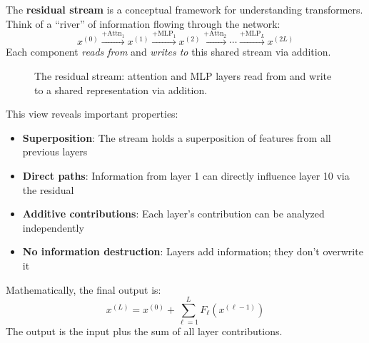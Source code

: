 \begin{definition}
    The \textbf{residual stream} is a conceptual framework for understanding transformers. Think of a ``river'' of information flowing through the network:
    \[
        x^{(0)} \xrightarrow{+\text{Attn}_1} x^{(1)} \xrightarrow{+\text{MLP}_1} x^{(2)} \xrightarrow{+\text{Attn}_2} \cdots \xrightarrow{+\text{MLP}_L} x^{(2L)}
    \]
    Each component \emph{reads from} and \emph{writes to} this shared stream via addition.
\end{definition}

\begin{figure}[h]
\centering
\caption{The residual stream: attention and MLP layers read from and write to a shared representation via addition.}
\end{figure}

\begin{remark}
    This view reveals important properties:
    \begin{itemize}
        \item \textbf{Superposition}: The stream holds a superposition of features from all previous layers
        \item \textbf{Direct paths}: Information from layer 1 can directly influence layer 10 via the residual
        \item \textbf{Additive contributions}: Each layer's contribution can be analyzed independently
        \item \textbf{No information destruction}: Layers add information; they don't overwrite it
    \end{itemize}

    Mathematically, the final output is:
    \[
        x^{(L)} = x^{(0)} + \sum_{\ell=1}^{L} F_\ell(x^{(\ell-1)})
    \]
    The output is the input plus the sum of all layer contributions.
\end{remark}


